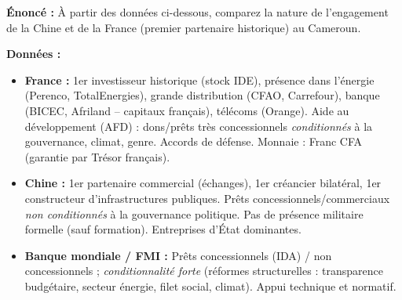 \documentclass[11pt]{article}
\begin{document}
\begin{exoresolu}
\textbf{Énoncé :} À partir des données ci-dessous, comparez la nature de l'engagement de la Chine et de la France (premier partenaire historique) au Cameroun.

\textbf{Données :}
\begin{itemize}
    \item \textbf{France :} 1er investisseur historique (stock IDE), présence dans l'énergie (Perenco, TotalEnergies), grande distribution (CFAO, Carrefour), banque (BICEC, Afriland -- capitaux français), télécoms (Orange). Aide au développement (AFD) : dons/prêts très concessionnels \emph{conditionnés} à la gouvernance, climat, genre. Accords de défense. Monnaie : Franc CFA (garantie par Trésor français).
    \item \textbf{Chine :} 1er partenaire commercial (échanges), 1er créancier bilatéral, 1er constructeur d'infrastructures publiques. Prêts concessionnels/commerciaux \emph{non conditionnés} à la gouvernance politique. Pas de présence militaire formelle (sauf formation). Entreprises d'État dominantes.
    \item \textbf{Banque mondiale / FMI :} Prêts concessionnels (IDA) / non concessionnels ; \emph{conditionnalité forte} (réformes structurelles : transparence budgétaire, secteur énergie, filet social, climat). Appui technique et normatif.
\end{itemize}


\end{exoresolu}
\end{document}
